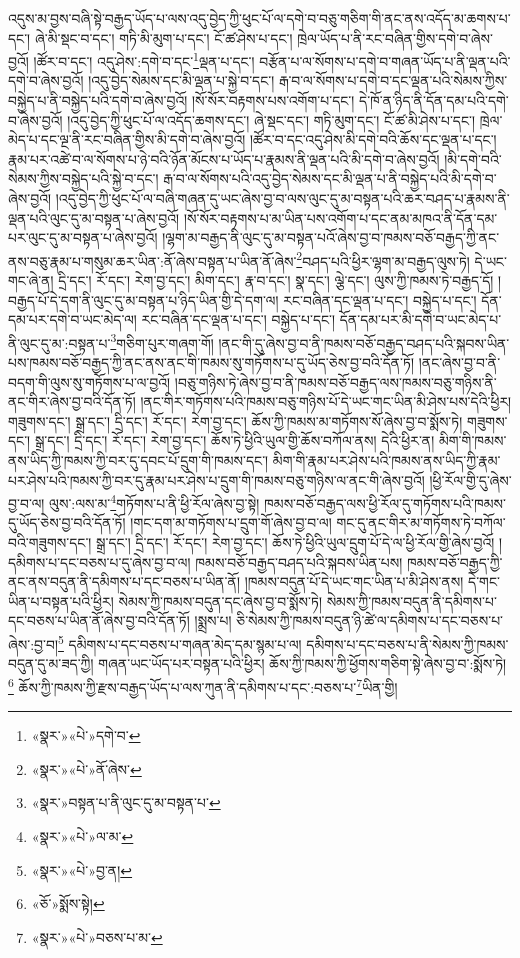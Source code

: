 འདུས་མ་བྱས་བཞི་སྟེ་བརྒྱད་ཡོད་པ་ལས་འདུ་བྱེད་ཀྱི་ཕུང་པོ་ལ་དགེ་བ་བཅུ་གཅིག་གི་ནང་ནས་འདོད་མ་ཆགས་པ་དང་། ཞེ་མི་སྡང་བ་དང་། གཏི་མི་མུག་པ་དང་། ངོ་ཚ་ཤེས་པ་དང་། ཁྲེལ་ཡོད་པ་ནི་རང་བཞིན་གྱིས་དགེ་བ་ཞེས་བྱའོ། །ཚོར་བ་དང་། འདུ་ཤེས་:དགེ་བ་དང་\footnote{«སྣར་»«པེ་»དགེ་བ་}ལྡན་པ་དང་། བརྩོན་པ་ལ་སོགས་པ་དགེ་བ་གཞན་ཡོད་པ་ནི་ལྡན་པའི་དགེ་བ་ཞེས་བྱའོ། །འདུ་བྱེད་སེམས་དང་མི་ལྡན་པ་སྐྱེ་བ་དང་། རྒ་བ་ལ་སོགས་པ་དགེ་བ་དང་ལྡན་པའི་སེམས་ཀྱིས་བསྐྱེད་པ་ནི་བསྐྱེད་པའི་དགེ་བ་ཞེས་བྱའོ། །སོ་སོར་བརྟགས་པས་འགོག་པ་དང་། དེ་ཁོ་ན་ཉིད་ནི་དོན་དམ་པའི་དགེ་བ་ཞེས་བྱའོ། །འདུ་བྱེད་ཀྱི་ཕུང་པོ་ལ་འདོད་ཆགས་དང་། ཞེ་སྡང་དང་། གཏི་མུག་དང་། ངོ་ཚ་མི་ཤེས་པ་དང་། ཁྲེལ་མེད་པ་དང་ལྔ་ནི་རང་བཞིན་གྱིས་མི་དགེ་བ་ཞེས་བྱའོ། །ཚོར་བ་དང་འདུ་ཤེས་མི་དགེ་བའི་ཆོས་དང་ལྡན་པ་དང་། རྣམ་པར་འཚེ་བ་ལ་སོགས་པ་ཉེ་བའི་ཉོན་མོངས་པ་ཡོད་པ་རྣམས་ནི་ལྡན་པའི་མི་དགེ་བ་ཞེས་བྱའོ། །མི་དགེ་བའི་སེམས་ཀྱིས་བསྐྱེད་པའི་སྐྱེ་བ་དང་། རྒ་བ་ལ་སོགས་པའི་འདུ་བྱེད་སེམས་དང་མི་ལྡན་པ་ནི་བསྐྱེད་པའི་མི་དགེ་བ་ཞེས་བྱའོ། །འདུ་བྱེད་ཀྱི་ཕུང་པོ་ལ་བཞི་གཞན་དུ་ཡང་ཞེས་བྱ་བ་ལས་ལུང་དུ་མ་བསྟན་པའི་ཆར་བཤད་པ་རྣམས་ནི་ལྡན་པའི་ལུང་དུ་མ་བསྟན་པ་ཞེས་བྱའོ། །སོ་སོར་བརྟགས་པ་མ་ཡིན་པས་འགོག་པ་དང་ནམ་མཁའ་ནི་དོན་དམ་པར་ལུང་དུ་མ་བསྟན་པ་ཞེས་བྱའོ། །ལྷག་མ་བརྒྱད་ནི་ལུང་དུ་མ་བསྟན་པའོ་ཞེས་བྱ་བ་ཁམས་བཅོ་བརྒྱད་ཀྱི་ནང་ནས་བཅུ་རྣམ་པ་གསུམ་ཆར་ཡིན་:ནོ་ཞེས་བསྟན་པ་ཡིན་ནོ་ཞེས་\footnote{«སྣར་»«པེ་»ནོ་ཞེས་}བཤད་པའི་ཕྱིར་ལྷག་མ་བརྒྱད་ལུས་ཏེ། དེ་ཡང་གང་ཞེ་ན། དྲི་དང་། རོ་དང་། རེག་བྱ་དང་། མིག་དང་། རྣ་བ་དང་། སྣ་དང་། ལྕེ་དང་། ལུས་ཀྱི་ཁམས་ཏེ་བརྒྱད་དོ། །བརྒྱད་པོ་དེ་དག་ནི་ལུང་དུ་མ་བསྟན་པ་ཉིད་ཡིན་གྱི་དེ་དག་ལ། རང་བཞིན་དང་ལྡན་པ་དང་། བསྐྱེད་པ་དང་། དོན་དམ་པར་དགེ་བ་ཡང་མེད་ལ། རང་བཞིན་དང་ལྡན་པ་དང་། བསྐྱེད་པ་དང་། དོན་དམ་པར་མི་དགེ་བ་ཡང་མེད་པ་ནི་ལུང་དུ་མ་:བསྟན་པ་\footnote{«སྣར་»བསྟན་པ་ནི་ལུང་དུ་མ་བསྟན་པ་}གཅིག་པུར་གཞག་གོ། །ནང་གི་དུ་ཞེས་བྱ་བ་ནི་ཁམས་བཅོ་བརྒྱད་བཤད་པའི་སྐབས་ཡིན་པས་ཁམས་བཅོ་བརྒྱད་ཀྱི་ནང་ནས་ནང་གི་ཁམས་སུ་གཏོགས་པ་དུ་ཡོད་ཅེས་བྱ་བའི་དོན་ཏོ། །ནང་ཞེས་བྱ་བ་ནི་བདག་གི་ལུས་སུ་གཏོགས་པ་ལ་བྱའོ། །བཅུ་གཉིས་ཏེ་ཞེས་བྱ་བ་ནི་ཁམས་བཅོ་བརྒྱད་ལས་ཁམས་བཅུ་གཉིས་ནི་ནང་གིར་ཞེས་བྱ་བའི་དོན་ཏོ། །ནང་གིར་གཏོགས་པའི་ཁམས་བཅུ་གཉིས་པོ་དེ་ཡང་གང་ཡིན་མི་ཤེས་པས་དེའི་ཕྱིར། གཟུགས་དང་། སྒྲ་དང་། དྲི་དང་། རོ་དང་། རེག་བྱ་དང་། ཆོས་ཀྱི་ཁམས་མ་གཏོགས་སོ་ཞེས་བྱ་བ་སྨོས་ཏེ། གཟུགས་དང་། སྒྲ་དང་། དྲི་དང་། རོ་དང་། རེག་བྱ་དང་། ཆོས་ཏེ་ཕྱིའི་ཡུལ་གྱི་ཆོས་བཀོལ་ནས། དེའི་ཕྱིར་ན། མིག་གི་ཁམས་ནས་ཡིད་ཀྱི་ཁམས་ཀྱི་བར་དུ་དབང་པོ་དྲུག་གི་ཁམས་དང་། མིག་གི་རྣམ་པར་ཤེས་པའི་ཁམས་ནས་ཡིད་ཀྱི་རྣམ་པར་ཤེས་པའི་ཁམས་ཀྱི་བར་དུ་རྣམ་པར་ཤེས་པ་དྲུག་གི་ཁམས་བཅུ་གཉིས་ལ་ནང་གི་ཞེས་བྱའོ། །ཕྱི་རོལ་གྱི་དུ་ཞེས་བྱ་བ་ལ། ལུས་:ལས་མ་\footnote{«སྣར་»«པེ་»ལ་མ་}གཏོགས་པ་ནི་ཕྱི་རོལ་ཞེས་བྱ་སྟེ། ཁམས་བཅོ་བརྒྱད་ལས་ཕྱི་རོལ་དུ་གཏོགས་པའི་ཁམས་དུ་ཡོད་ཅེས་བྱ་བའི་དོན་ཏོ། །གང་དག་མ་གཏོགས་པ་དྲུག་གོ་ཞེས་བྱ་བ་ལ། གང་དུ་ནང་གིར་མ་གཏོགས་ཏེ་བཀོལ་བའི་གཟུགས་དང་། སྒྲ་དང་། དྲི་དང་། རོ་དང་། རེག་བྱ་དང་། ཆོས་ཏེ་ཕྱིའི་ཡུལ་དྲུག་པོ་དེ་ལ་ཕྱི་རོལ་གྱི་ཞེས་བྱའོ། །དམིགས་པ་དང་བཅས་པ་དུ་ཞེས་བྱ་བ་ལ། ཁམས་བཅོ་བརྒྱད་བཤད་པའི་སྐབས་ཡིན་པས། ཁམས་བཅོ་བརྒྱད་ཀྱི་ནང་ནས་བདུན་ནི་དམིགས་པ་དང་བཅས་པ་ཡིན་ནོ། །ཁམས་བདུན་པོ་དེ་ཡང་གང་ཡིན་པ་མི་ཤེས་ནས། དེ་གང་ཡིན་པ་བསྟན་པའི་ཕྱིར། སེམས་ཀྱི་ཁམས་བདུན་དང་ཞེས་བྱ་བ་སྨོས་ཏེ། སེམས་ཀྱི་ཁམས་བདུན་ནི་དམིགས་པ་དང་བཅས་པ་ཡིན་ནོ་ཞེས་བྱ་བའི་དོན་ཏོ། །སྨྲས་པ། ཅི་སེམས་ཀྱི་ཁམས་བདུན་ཉི་ཚེ་ལ་དམིགས་པ་དང་བཅས་པ་ཞེས་:བྱ་བ།\footnote{«སྣར་»«པེ་»བྱ་ན།} དམིགས་པ་དང་བཅས་པ་གཞན་མེད་དམ་སྙམ་པ་ལ། དམིགས་པ་དང་བཅས་པ་ནི་སེམས་ཀྱི་ཁམས་བདུན་དུ་མ་ཟད་ཀྱི། གཞན་ཡང་ཡོད་པར་བསྟན་པའི་ཕྱིར། ཆོས་ཀྱི་ཁམས་ཀྱི་ཕྱོགས་གཅིག་སྟེ་ཞེས་བྱ་བ་:སྨོས་ཏེ།\footnote{«ཅོ་»སྨོས་སྟེ།} ཆོས་ཀྱི་ཁམས་ཀྱི་རྫས་བརྒྱད་ཡོད་པ་ལས་ཀུན་ནི་དམིགས་པ་དང་:བཅས་པ་\footnote{«སྣར་»«པེ་»བཅས་པ་མ་}ཡིན་གྱི། 